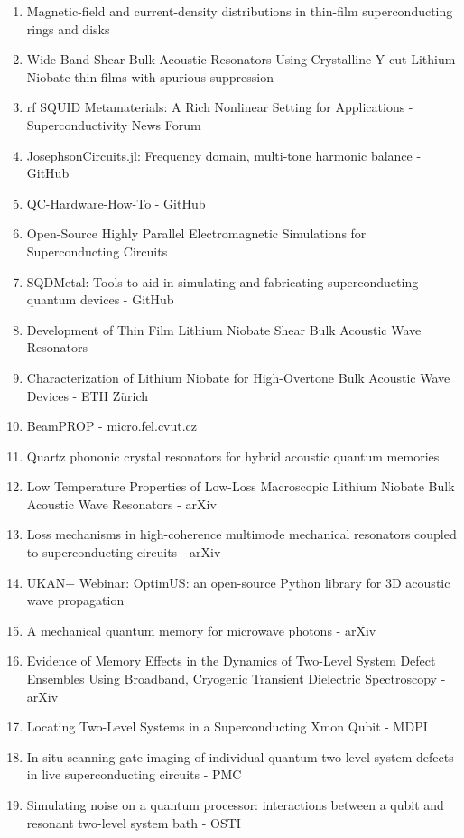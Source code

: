 \documentclass[11pt, a4paper]{article}
\begin{document}
\begin{enumerate}
    \item Magnetic-field and current-density distributions in thin-film superconducting rings and disks
    \item Wide Band Shear Bulk Acoustic Resonators Using Crystalline Y-cut Lithium Niobate thin films with spurious suppression
    \item rf SQUID Metamaterials: A Rich Nonlinear Setting for Applications - Superconductivity News Forum
    \item JosephsonCircuits.jl: Frequency domain, multi-tone harmonic balance - GitHub
    \item QC-Hardware-How-To - GitHub
    \item Open-Source Highly Parallel Electromagnetic Simulations for Superconducting Circuits
    \item SQDMetal: Tools to aid in simulating and fabricating superconducting quantum devices - GitHub
    \item Development of Thin Film Lithium Niobate Shear Bulk Acoustic Wave Resonators
    \item Characterization of Lithium Niobate for High-Overtone Bulk Acoustic Wave Devices - ETH Z\"urich
    \item BeamPROP - micro.fel.cvut.cz
    \item Quartz phononic crystal resonators for hybrid acoustic quantum memories
    \item Low Temperature Properties of Low-Loss Macroscopic Lithium Niobate Bulk Acoustic Wave Resonators - arXiv
    \item Loss mechanisms in high-coherence multimode mechanical resonators coupled to superconducting circuits - arXiv
    \item UKAN+ Webinar: OptimUS: an open-source Python library for 3D acoustic wave propagation
    \item A mechanical quantum memory for microwave photons - arXiv
    \item Evidence of Memory Effects in the Dynamics of Two-Level System Defect Ensembles Using Broadband, Cryogenic Transient Dielectric Spectroscopy - arXiv
    \item Locating Two-Level Systems in a Superconducting Xmon Qubit - MDPI
    \item In situ scanning gate imaging of individual quantum two-level system defects in live superconducting circuits - PMC
    \item Simulating noise on a quantum processor: interactions between a qubit and resonant two-level system bath - OSTI

\end{enumerate}
\end{document}

